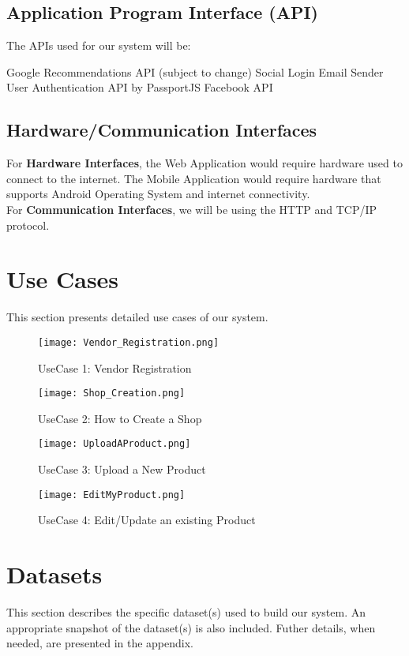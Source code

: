 \subsection{Application Program Interface (API)}
The APIs used for our system will be: 
\begin{outline}
    \1 Google Recommendations API (subject to change)
    \1 Social Login
    \1 Email Sender
    \1 User Authentication API by PassportJS
    \1 Facebook API
\end{outline}

\subsection{Hardware/Communication Interfaces}
For \textbf{Hardware Interfaces}, the Web Application would require hardware used to connect to the internet. The Mobile Application would require hardware that supports Android Operating System and internet connectivity. \\ For \textbf{Communication Interfaces}, we will be using the HTTP and TCP/IP protocol.

\section{Use Cases}
This section presents detailed use cases of our system.
\begin{figure}
  \caption{UseCase 1: Vendor Registration}
  \texttt{[image: Vendor\_Registration.png]}
  \centering
\end{figure}
\begin{figure}
  \caption{UseCase 2: How to Create a Shop}
  \texttt{[image: Shop\_Creation.png]}
  \centering
\end{figure}
\begin{figure}
  \caption{UseCase 3: Upload a New Product}
  \texttt{[image: UploadAProduct.png]}
  \centering
\end{figure}
\begin{figure}
  \caption{UseCase 4: Edit/Update an existing Product}
  \texttt{[image: EditMyProduct.png]}
  \centering
\end{figure}

\section{Datasets}
This section describes the specific dataset(s) used to build our system. An appropriate snapshot of the dataset(s) is also included. Futher details, when needed, are presented in the appendix.

